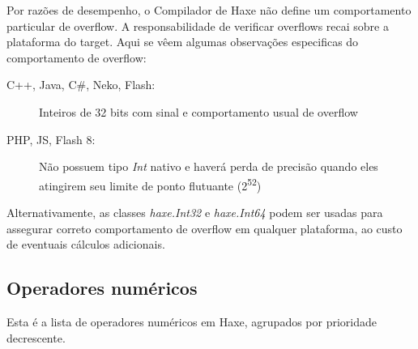 Por razões de desempenho, o Compilador de Haxe não define um comportamento particular de overflow. A responsabilidade de verificar overflows recai sobre a plataforma do target. Aqui se vêem algumas observações especificas do comportamento de overflow:

\begin{description}
 \item[C++, Java, C\#, Neko, Flash:] Inteiros de 32 bits com sinal e comportamento usual de overflow 
 \item[PHP, JS, Flash 8:] Não possuem tipo \emph{Int} nativo e haverá perda de precisão quando eles atingirem seu limite de ponto flutuante (2\textsuperscript{52})
\end{description}

Alternativamente, as classes \emph{haxe.Int32} e \emph{haxe.Int64} podem ser usadas para assegurar correto comportamento de overflow em qualquer plataforma, ao custo de eventuais cálculos adicionais.

\subsection{Operadores numéricos}
\label{types-numeric-operators}

Esta é a lista de operadores numéricos em Haxe, agrupados por prioridade decrescente.

